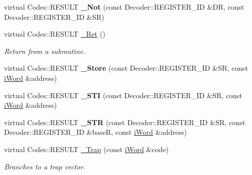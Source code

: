 \begin{DoxyCompactItemize}
\item 
\hypertarget{classWi11_a82aa3fdb656277723b2c0937206ccdae}{
virtual Codes::RESULT {\bfseries \_\-Not} (const Decoder::REGISTER\_\-ID \&DR, const Decoder::REGISTER\_\-ID \&SR)}
\label{classWi11_a82aa3fdb656277723b2c0937206ccdae}

\item 
virtual Codes::RESULT \hyperlink{classWi11_a8cbd4e75c8c10f69f4159c02955b4a1f}{\_\-Ret} ()
\begin{DoxyCompactList}\small\item\em Return from a subroutine. \item\end{DoxyCompactList}\item 
\hypertarget{classWi11_aeaafd928d0e450924a1b29fd3a6b828a}{
virtual Codes::RESULT {\bfseries \_\-Store} (const Decoder::REGISTER\_\-ID \&SR, const \hyperlink{classiWord}{iWord} \&address)}
\label{classWi11_aeaafd928d0e450924a1b29fd3a6b828a}

\item 
\hypertarget{classWi11_a466a425d5490850afc2f385b1ce47573}{
virtual Codes::RESULT {\bfseries \_\-STI} (const Decoder::REGISTER\_\-ID \&SR, const \hyperlink{classiWord}{iWord} \&address)}
\label{classWi11_a466a425d5490850afc2f385b1ce47573}

\item 
\hypertarget{classWi11_a0f6249d939e8f1aa2219a0f7c5e732e6}{
virtual Codes::RESULT {\bfseries \_\-STR} (const Decoder::REGISTER\_\-ID \&SR, const Decoder::REGISTER\_\-ID \&baseR, const \hyperlink{classiWord}{iWord} \&address)}
\label{classWi11_a0f6249d939e8f1aa2219a0f7c5e732e6}

\item 
virtual Codes::RESULT \hyperlink{classWi11_ac62ce0a9f8df8dacab577cee514cb199}{\_\-Trap} (const \hyperlink{classiWord}{iWord} \&code)
\begin{DoxyCompactList}\small\item\em Branches to a trap vector. \item\end{DoxyCompactList}\end{DoxyCompactItemize}

